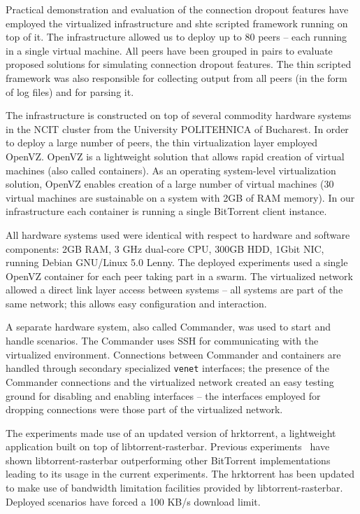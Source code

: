 Practical demonstration and evaluation of the connection dropout features
have employed the virtualized infrastructure and shte scripted framework
running on top of it. The infrastructure allowed us to deploy up to 80 peers
-- each running in a single virtual machine. All peers have been grouped in
pairs to evaluate proposed solutions for simulating connection dropout
features. The thin scripted framework was also responsible for collecting
output from all peers (in the form of log files) and for parsing it.

The infrastructure is constructed on top of several commodity hardware systems
in the NCIT cluster from the University POLITEHNICA of Bucharest. In order to
deploy a large number of peers, the thin virtualization layer employed OpenVZ.
OpenVZ is a lightweight solution that allows rapid creation of
virtual machines (also called containers). As an operating system-level
virtualization solution, OpenVZ enables creation of a large number of virtual
machines (30 virtual machines are sustainable on a system with 2GB of RAM
memory). In our infrastructure each container is running a single BitTorrent
client instance.

All hardware systems used were identical with respect to hardware and software
components: 2GB RAM, 3 GHz dual-core CPU, 300GB HDD, 1Gbit NIC, running Debian
GNU/Linux 5.0 Lenny. The deployed experiments used a single OpenVZ container
for each peer taking part in a swarm. The virtualized network
allowed a direct link layer access between systems -- all systems are part of
the same network; this allows easy configuration and interaction.

A separate hardware system, also called Commander, was used to start and
handle scenarios. The Commander uses SSH for communicating with the
virtualized environment. Connections between Commander and containers are
handled through secondary specialized \texttt{venet} interfaces; the presence
of the Commander connections and the virtualized network created an easy
testing ground for disabling and enabling interfaces -- the interfaces
employed for dropping connections were those part of the virtualized network.

The experiments made use of an updated version of hrktorrent, a lightweight
application built on top of libtorrent-rasterbar. Previous
experiments~\cite{bt-vi} have shown libtorrent-rasterbar outperforming other
BitTorrent implementations leading to its usage in the current experiments.
The hrktorrent has been updated to make use of bandwidth limitation facilities
provided by libtorrent-rasterbar.  Deployed scenarios have forced a 100 KB/s
download limit.

